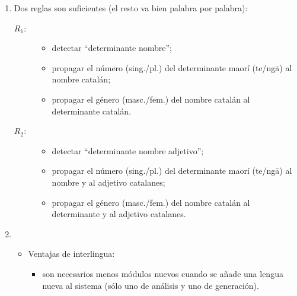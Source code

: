 \begin{enumerate}
\item Dos reglas son suficientes (el resto va bien palabra por palabra): 

\begin{description} \item[$R_1$:] 

\begin{itemize} \item detectar ``determinante nombre''; \item propagar el número (sing./pl.) del determinante maorí (te/ng\={a}) al nombre catalán; \item propagar el género (masc./fem.) del nombre catalán al determinante catalán. \end{itemize} \item[$R_2$:] \begin{itemize} \item detectar ``determinante nombre adjetivo''; \item propagar el número (sing./pl.) del determinante maorí (te/ng\={a}) al nombre y al adjetivo catalanes; \item propagar el género (masc./fem.) del nombre catalán al determinante y al adjetivo catalanes. \end{itemize} \end{description} \item

\begin{itemize} \item Ventajas de interlingua: \begin{itemize} \item son necesarios menos módulos nuevos cuando se añade una lengua nueva al sistema (sólo uno de análisis y uno de generación). 


\end{itemize}
\end{itemize}
\end{enumerate}
